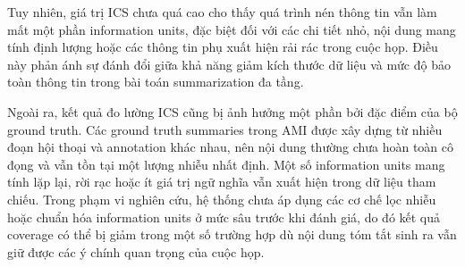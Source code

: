 Tuy nhiên, giá trị ICS chưa quá cao cho thấy quá trình nén thông tin vẫn làm mất một phần information units, đặc biệt đối với các chi tiết nhỏ, nội dung mang tính định lượng hoặc các thông tin phụ xuất hiện rải rác trong cuộc họp. Điều này phản ánh sự đánh đổi giữa khả năng giảm kích thước dữ liệu và mức độ bảo toàn thông tin trong bài toán summarization đa tầng.

Ngoài ra, kết quả đo lường ICS cũng bị ảnh hưởng một phần bởi đặc điểm của bộ ground truth. Các ground truth summaries trong AMI được xây dựng từ nhiều đoạn hội thoại và annotation khác nhau, nên nội dung thường chưa hoàn toàn cô đọng và vẫn tồn tại một lượng nhiễu nhất định. Một số information units mang tính lặp lại, rời rạc hoặc ít giá trị ngữ nghĩa vẫn xuất hiện trong dữ liệu tham chiếu. Trong phạm vi nghiên cứu, hệ thống chưa áp dụng các cơ chế lọc nhiễu hoặc chuẩn hóa information units ở mức sâu trước khi đánh giá, do đó kết quả coverage có thể bị giảm trong một số trường hợp dù nội dung tóm tắt sinh ra vẫn giữ được các ý chính quan trọng của cuộc họp.